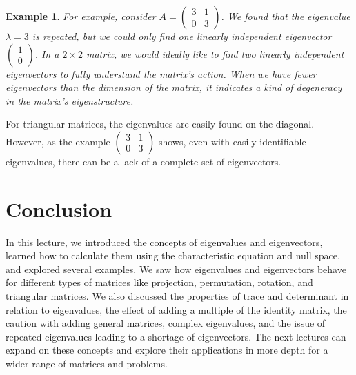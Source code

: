 \documentclass{article}
\newtheorem{example}{Example}
\begin{document}
\begin{example}
For example, consider $A = \begin{pmatrix} 3 & 1 \\ 0 & 3 \end{pmatrix}$. We found that the eigenvalue $\lambda = 3$ is repeated, but we could only find one linearly independent eigenvector $\begin{pmatrix} 1 \\ 0 \end{pmatrix}$.  In a $2 \times 2$ matrix, we would ideally like to find two linearly independent eigenvectors to fully understand the matrix's action. When we have fewer eigenvectors than the dimension of the matrix, it indicates a kind of degeneracy in the matrix's eigenstructure.
\end{example}


For triangular matrices, the eigenvalues are easily found on the diagonal. However, as the example $\begin{pmatrix} 3 & 1 \\ 0 & 3 \end{pmatrix}$ shows, even with easily identifiable eigenvalues, there can be a lack of a complete set of eigenvectors.

\section{Conclusion}

In this lecture, we introduced the concepts of eigenvalues and eigenvectors, learned how to calculate them using the characteristic equation and null space, and explored several examples. We saw how eigenvalues and eigenvectors behave for different types of matrices like projection, permutation, rotation, and triangular matrices. We also discussed the properties of trace and determinant in relation to eigenvalues, the effect of adding a multiple of the identity matrix, the caution with adding general matrices, complex eigenvalues, and the issue of repeated eigenvalues leading to a shortage of eigenvectors.  The next lectures can expand on these concepts and explore their applications in more depth for a wider range of matrices and problems.
\end{document}
